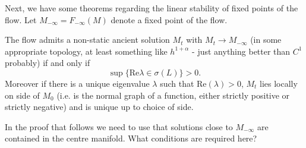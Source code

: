 \documentclass{amsart}
\begin{document}
Next, we have some theorems regarding the linear stability of fixed points of the flow. Let \(M_{-\infty} = F_{-\infty}(M)\) denote a fixed point of the flow.

\begin{thm}
The flow admits a non-static ancient solution \(M_t\) with \(M_t \to M_{-\infty}\) (in some appropriate topology, at least something like \(h^{1+\alpha}\) - just anything better than \(C^1\) probably) if and only if
\[
\sup \{\text{Re}\lambda \in \sigma(L)\} > 0.
\]
Moreover if there is a unique eigenvalue \(\lambda\) such that \(\text{Re}(\lambda) > 0\), \(M_t\) lies locally on side of \(M_0\) (i.e. is the normal graph of a function, either strictly positive or strictly negative) and is unique up to choice of side.
\end{thm}

\begin{rem}
In the proof that follows we need to use that solutions close to \(M_{-\infty}\) are contained in the centre manifold. What conditions are required here?
\end{rem}
\end{document}
